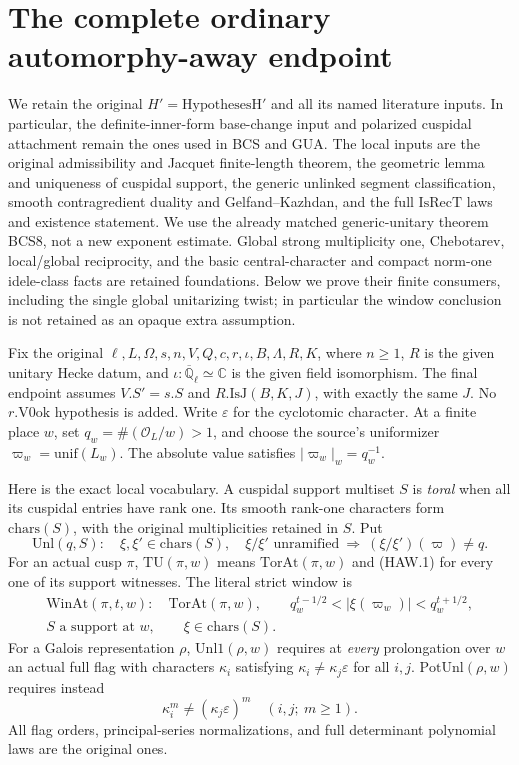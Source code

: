 \documentclass[11pt,a4paper]{article}
\numberwithin{equation}{section}
\theoremstyle{remark}\newtheorem{remark}[theorem]{Remark}
\begin{document}
\section{The complete ordinary automorphy-away endpoint}
\label{sec:automorphy-away-v45}

We retain the original $H'=\mathrm{HypothesesH'}$ and all its
named literature inputs.  In particular, the definite-inner-form
base-change input and polarized cuspidal attachment remain the
ones used in BCS and GUA.  The local inputs are the original
admissibility and Jacquet finite-length theorem, the geometric
lemma and uniqueness of cuspidal support, the generic unlinked
segment classification, smooth contragredient duality and
Gelfand--Kazhdan, and the full $\mathrm{IsRecT}$ laws and existence
statement.  We use the already matched generic-unitary theorem
BCS8, not a new exponent estimate.  Global strong multiplicity one,
Chebotarev, local/global reciprocity, and the basic central-character
and compact norm-one idele-class facts are retained foundations.
Below we prove their finite consumers, including the single global
unitarizing twist; in
particular the window conclusion is not retained as an opaque
extra assumption.

Fix the original $\ell,L,\Omega,s,n,V,Q,c,r,\iota,B,\Lambda,R,K$,
where $n\ge1$, $R$ is the given unitary Hecke datum, and
$\iota:\overline{\mathbb Q}_\ell\simeq\mathbb C$ is the given
field isomorphism.  The final endpoint assumes $V.S'=s.S$ and
$R.\mathrm{IsJ}(B,K,J)$, with exactly the same $J$.  No
$r.\mathrm{V0ok}$ hypothesis is added.  Write $\varepsilon$ for
the cyclotomic character.  At a finite place $w$, set
$q_w=\#(\mathcal O_L/w)>1$, and choose the source's uniformizer
$\varpi_w=\mathrm{unif}(L_w)$.  The absolute value satisfies
$|\varpi_w|_w=q_w^{-1}$.

Here is the exact local vocabulary.  A cuspidal support multiset
$S$ is \emph{toral} when all its cuspidal entries have rank one.
Its smooth rank-one characters form $\mathrm{chars}(S)$, with
the original multiplicities retained in $S$.  Put
\[
 \mathrm{Unl}(q,S):\quad
 \xi,\xi'\in\mathrm{chars}(S),\quad \xi/\xi'\text{ unramified}
       \ \Longrightarrow\ (\xi/\xi')(\varpi)\ne q .
 \tag{HAW.1}
\]
For an actual cusp $\pi$, $\mathrm{TU}(\pi,w)$ means
$\mathrm{TorAt}(\pi,w)$ and (HAW.1) for every one of its
support witnesses.  The literal strict window is
\[
 \begin{gathered}
 \mathrm{WinAt}(\pi,t,w):\quad \mathrm{TorAt}(\pi,w),\qquad
 q_w^{t-1/2}<|\xi(\varpi_w)|<q_w^{t+1/2},\\
 S\text{ a support at }w,\qquad\xi\in\mathrm{chars}(S).
 \end{gathered}
 \tag{HAW.2}
\]
For a Galois representation $\rho$, $\mathrm{Unl1}(\rho,w)$
requires at \emph{every} prolongation over $w$ an actual full flag
with characters $\kappa_i$ satisfying
$\kappa_i\ne\kappa_j\varepsilon$ for all $i,j$.
$\mathrm{PotUnl}(\rho,w)$ requires instead
\[
       \kappa_i^m\ne(\kappa_j\varepsilon)^m
                         \quad(i,j;\ m\ge1).
 \tag{HAW.3}
\]
All flag orders, principal-series normalizations, and full
determinant polynomial laws are the original ones.
\end{document}
